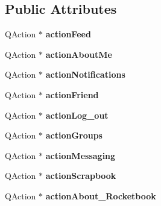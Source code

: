 \subsection*{Public Attributes}
\begin{DoxyCompactItemize}
\item 
Q\+Action $\ast$ {\bfseries action\+Feed}\hypertarget{classUi__MainWindow_ac3b9246aca22bc9e745567ab6444d22f}{}\label{classUi__MainWindow_ac3b9246aca22bc9e745567ab6444d22f}

\item 
Q\+Action $\ast$ {\bfseries action\+About\+Me}\hypertarget{classUi__MainWindow_a59b13fd98fc5161d61c79ca53bcba9c0}{}\label{classUi__MainWindow_a59b13fd98fc5161d61c79ca53bcba9c0}

\item 
Q\+Action $\ast$ {\bfseries action\+Notifications}\hypertarget{classUi__MainWindow_a94d0bbaa08d248e65c9341e2c43fa773}{}\label{classUi__MainWindow_a94d0bbaa08d248e65c9341e2c43fa773}

\item 
Q\+Action $\ast$ {\bfseries action\+Friend}\hypertarget{classUi__MainWindow_a47d70f70e8c10510aa092b43368da59b}{}\label{classUi__MainWindow_a47d70f70e8c10510aa092b43368da59b}

\item 
Q\+Action $\ast$ {\bfseries action\+Log\+\_\+out}\hypertarget{classUi__MainWindow_a1888eb56e1afbdaeaa88441f78df4d72}{}\label{classUi__MainWindow_a1888eb56e1afbdaeaa88441f78df4d72}

\item 
Q\+Action $\ast$ {\bfseries action\+Groups}\hypertarget{classUi__MainWindow_a82bdcc5398ec27690074f5a6c90c52f9}{}\label{classUi__MainWindow_a82bdcc5398ec27690074f5a6c90c52f9}

\item 
Q\+Action $\ast$ {\bfseries action\+Messaging}\hypertarget{classUi__MainWindow_a69fa12b07069d62253c91e88dcbf5762}{}\label{classUi__MainWindow_a69fa12b07069d62253c91e88dcbf5762}

\item 
Q\+Action $\ast$ {\bfseries action\+Scrapbook}\hypertarget{classUi__MainWindow_ae07e83aca8317cf78dfdf8413a215ef4}{}\label{classUi__MainWindow_ae07e83aca8317cf78dfdf8413a215ef4}

\item 
Q\+Action $\ast$ {\bfseries action\+About\+\_\+\+Rocketbook}\hypertarget{classUi__MainWindow_aef0bd52051f89ded772e77c145611020}{}\label{classUi__MainWindow_aef0bd52051f89ded772e77c145611020}


\end{DoxyCompactItemize}
